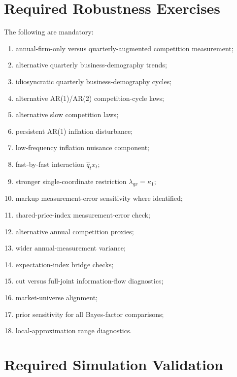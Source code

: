 \documentclass[11pt]{article}
\begin{document}
\section{Required Robustness Exercises}

The following are mandatory:
\begin{enumerate}
\item annual-firm-only versus quarterly-augmented competition measurement;
\item alternative quarterly business-demography trends;
\item idiosyncratic quarterly business-demography cycles;
\item alternative AR(1)/AR(2) competition-cycle laws;
\item alternative slow competition laws;
\item persistent AR(1) inflation disturbance;
\item low-frequency inflation nuisance component;
\item fast-by-fast interaction \(\hat q_tx_t\);
\item stronger single-coordinate restriction \(\lambda_{qx}=\kappa_1\);
\item markup measurement-error sensitivity where identified;
\item shared-price-index measurement-error check;
\item alternative annual competition proxies;
\item wider annual-measurement variance;
\item expectation-index bridge checks;
\item cut versus full-joint information-flow diagnostics;
\item market-universe alignment;
\item prior sensitivity for all Bayes-factor comparisons;
\item local-approximation range diagnostics.
\end{enumerate}

\section{Required Simulation Validation}
\end{document}
